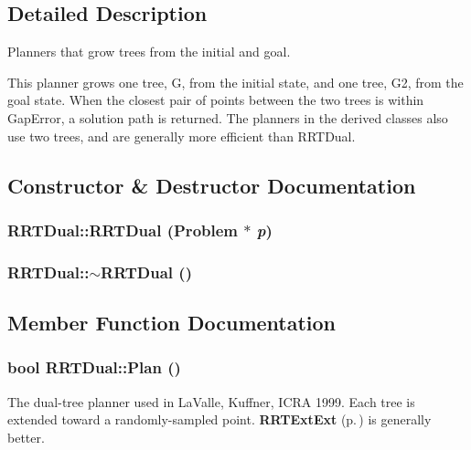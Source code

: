 \subsection{Detailed Description}
Planners that grow trees from the initial and goal.

This planner grows one tree, G, from the initial state,  and one tree, G2, from the goal state. When the closest pair of points between the two trees is within Gap\-Error, a solution path is returned. The planners in the derived classes also use two trees, and are generally more efficient than RRTDual. 



\subsection{Constructor \& Destructor Documentation}
\subsubsection{\setlength{\rightskip}{0pt plus 5cm}RRTDual::RRTDual ({\bf Problem} $\ast$ {\em p})}\label{class_RRTDual_a0}


\subsubsection{\setlength{\rightskip}{0pt plus 5cm}RRTDual::$\sim$RRTDual ()\hspace{0.3cm}{\tt  [inline, virtual]}}\label{class_RRTDual_a1}




\subsection{Member Function Documentation}
\subsubsection{\setlength{\rightskip}{0pt plus 5cm}bool RRTDual::Plan ()\hspace{0.3cm}{\tt  [virtual]}}\label{class_RRTDual_a2}


The dual-tree planner used in La\-Valle, Kuffner, ICRA 1999. Each tree is extended toward a randomly-sampled point. {\bf RRTExt\-Ext} {\rm (p.\,\pageref{class_RRTExtExt})} is generally better.



